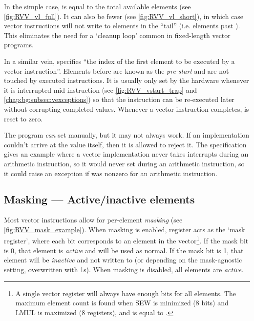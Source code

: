 In the simple case,  is equal to the total available elements (see \cref{fig:RVV_vl_full}).
It can also be fewer (see \cref{fig:RVV_vl_short}), in which case vector instructions will not write to elements in the \enquote{tail} (i.e. elements past ).
This eliminates the need for a `cleanup loop' common in fixed-length vector programs.


In a similar vein,  specifies \enquote{the index of the first element to be executed by a vector instruction}.
Elements before  are known as the \emph{pre-start} and are not touched by executed instructions.
It is usually only set by the hardware whenever it is interrupted mid-instruction (see \cref{fig:RVV_vstart_trap} and \cref{chap:bg:subsec:vexceptions}) so that the instruction can be re-executed later without corrupting completed values.
Whenever a vector instruction completes,  is reset to zero.

The program \emph{can} set  manually, but it may not always work.
If an implementation couldn't arrive at the value itself, then it is allowed to reject it.
The specification gives an example where a vector implementation never takes interrupts during an arithmetic instruction, so it would never set  during an arithmetic instruction, so it could raise an exception if  was nonzero for an arithmetic instruction.

\subsection{Masking --- Active/inactive elements}\label{chap:bg:subsec:rvvmasking}
Most vector instructions allow for per-element \emph{masking} (see \cref{fig:RVV_mask_example}).
When masking is enabled, register  acts as the `mask register', where each bit corresponds to an element in the vector\footnote{A single vector register will always have enough bits for all elements. The maximum element count is found when SEW is minimized (8 bits) and LMUL is maximized (8 registers), and is equal to .}.
If the mask bit is 0, that element is \emph{active} and will be used as normal.
If the mask bit is 1, that element will be \emph{inactive} and not written to (or depending on the mask-agnostic setting, overwritten with 1s).
When masking is disabled, all elements are \emph{active}.

